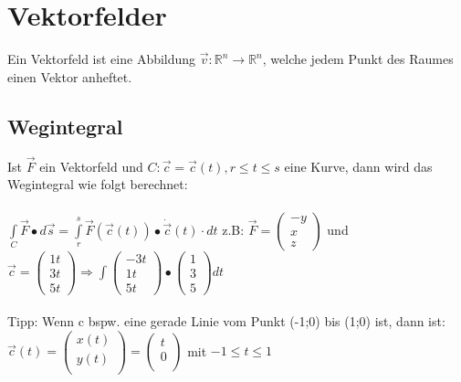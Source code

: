 \section{Vektorfelder}
  Ein Vektorfeld ist eine Abbildung $\vec{v}:\mathbb{R}^n\rightarrow
  \mathbb{R}^n$, welche jedem Punkt des Raumes einen Vektor anheftet.
  
\subsection{Wegintegral}
  Ist $\vec{F}$ ein Vektorfeld und $C:\vec{c}=\vec{c}(t),r\leq t \leq s$ eine
  Kurve, dann wird das Wegintegral wie folgt berechnet:\\\\
  $\boxed{\int\limits_C\vec{F}\bullet d\vec{s}=
  \int\limits_r^s\vec{F}(\vec{c}(t))\bullet \dot{\vec{c}}(t)\cdot dt}$
  z.B: $\vec{F}=\begin{pmatrix}
    -y \\
    x \\
    z
  \end{pmatrix}$ und $\vec c = \begin{pmatrix}
    1t \\
    3t \\
    5t 
  \end{pmatrix} \Rightarrow \int\begin{pmatrix}
    -3t\\
    1t \\
    5t
  \end{pmatrix} \bullet \begin{pmatrix}
    1\\
    3\\
    5
  \end{pmatrix} dt$
  \\\\
  Tipp: Wenn c bspw. eine gerade Linie vom Punkt (-1;0) bis (1;0) ist, dann ist:\\
  $\vec{c}(t)=
  \begin{pmatrix}
    x(t)\\
    y(t)\\
  \end{pmatrix}
  =
  \begin{pmatrix}
    t\\
    0\\
  \end{pmatrix}$
  mit $-1\leq t \leq 1$

